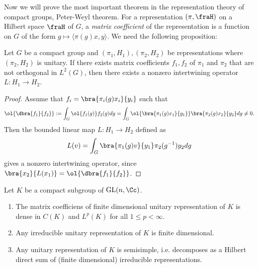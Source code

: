 Now we will prove the most important theorem in the representation theory of compact groups, Peter-Weyl theorem. For a representation $(\pi, \fraH)$ on a Hilbert space $\fraH$ of $G$, a \emph{matrix coefficient} of the representation is a function on $G$ of the form $g\mapsto \langle \pi(g)x, y\rangle$. 
We need the following proposition:
\begin{proposition}
\label{nonzeroint}
Let $G$ be a compact group and $(\pi_{1}, H_{1}), (\pi_{2}, H_{2})$ be representations where $(\pi_{2}, H_{2})$ is unitary. 
If there exists matrix coefficients $f_{1}, f_{2}$ of $\pi_{1}$ and $\pi_{2}$ that are not orthogonal in $L^{2}(G)$, then there exists a nonzero intertwining operator $L:H_{1}\to H_{2}$. 
\end{proposition}
\begin{proof}
Assume that $f_{i} = \bra{\pi_{i}(g)x_{i}}{y_{i}}$ such that
$$
\ol{\dbra{f_{1}}{f_{2}}} := \int_{G} \ol{f_{1}(g)} f_{2}(g) dg = \int_{G} \ol{\bra{\pi_{1}(g)x_{1}}{y_{1}}}\bra{\pi_{2}(g)x_{2}}{y_{2}} dg \neq 0. 
$$
Then the bounded linear map $L:H_{1}\to H_{2}$ defined as
$$
L(v) = \int_{G} \bra{\pi_{1}(g)v}{y_{1}} \pi_{2}(g^{-1})y_{2} dg
$$
gives a nonzero intertwining operator, since $\bra{x_{2}}{L(x_{1})} = \ol{\dbra{f_{1}}{f_{2}}}$. 
\end{proof}
\begin{theorem}
Let $K$ be a compact subgroup of $\GL(n, \Cc)$.
\begin{enumerate}
\item The matrix coefficiens of finite dimensional unitary representation of $K$ is dense in $C(K)$ and $L^{p}(K)$ for all $1\leq p <\infty$. 
\item Any irreducible unitary representation of $K$ is finite dimensional. 
\item Any unitary representation of $K$ is semisimple, i.e. decomposes as a Hilbert direct sum of (finite dimensional) irreducible representations. 
\end{enumerate}
\end{theorem}
